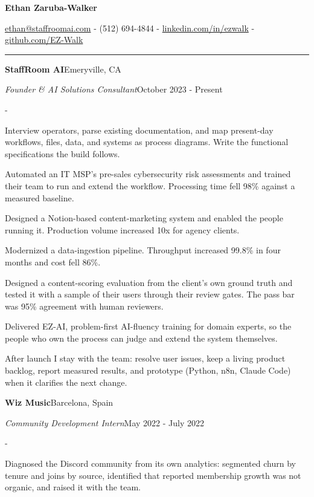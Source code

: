 \documentclass[10pt,letterpaper]{article}
\newenvironment{cvitems}{%
  \begin{list}{-}{%
    \setlength{\leftmargin}{12pt}%
    \setlength{\itemsep}{1.2pt}%
    \setlength{\parsep}{0pt}%
    \setlength{\topsep}{1.5pt}%
    \setlength{\partopsep}{0pt}%
    \setlength{\labelwidth}{6pt}%
    \setlength{\labelsep}{6pt}%
    \setlength{\itemindent}{0pt}%
  }%
}{\end{list}}
\newcommand{\cvsection}[1]{%
  \vspace{7pt}%
  \noindent{\bfseries\fontsize{11pt}{13pt}\selectfont\MakeUppercase{#1}}\par
  \vspace{1pt}%
  \noindent\rule{\textwidth}{0.4pt}\par
  \vspace{4pt}%
}
\newcommand{\cventryhead}[4]{%
  \noindent\textbf{#1}\hfill#2\par
  \vspace{0.5pt}%
  \noindent\textit{#3}\hfill#4\par
}
\begin{document}
\begin{center}
  {\bfseries\fontsize{22pt}{24pt}\selectfont Ethan Zaruba-Walker\par}
  \vspace{4pt}
  {\fontsize{10pt}{12pt}\selectfont
    \href{mailto:ethan@staffroomai.com}{ethan@staffroomai.com}
    {-}
    (512) 694-4844
    {-}
    \href{https://linkedin.com/in/ezwalk}{linkedin.com/in/ezwalk}
    {-}
    \href{https://github.com/EZ-Walk}{github.com/EZ-Walk}\par}
\end{center}
\vspace{2pt}

\cvsection{Experience}

\cventryhead{StaffRoom AI}{Emeryville, CA}
{Founder \& AI Solutions Consultant}{October 2023 - Present}
\begin{cvitems}
  \item Interview operators, parse existing documentation, and map present-day workflows, files, data, and systems as process diagrams. Write the functional specifications the build follows.
  \item Automated an IT MSP's pre-sales cybersecurity risk assessments and trained their team to run and extend the workflow. Processing time fell 98\% against a measured baseline.
  \item Designed a Notion-based content-marketing system and enabled the people running it. Production volume increased 10x for agency clients.
  \item Modernized a data-ingestion pipeline. Throughput increased 99.8\% in four months and cost fell 86\%.
  \item Designed a content-scoring evaluation from the client's own ground truth and tested it with a sample of their users through their review gates. The pass bar was 95\% agreement with human reviewers.
  \item Delivered EZ-AI, problem-first AI-fluency training for domain experts, so the people who own the process can judge and extend the system themselves.
  \item After launch I stay with the team: resolve user issues, keep a living product backlog, report measured results, and prototype (Python, n8n, Claude Code) when it clarifies the next change.
\end{cvitems}

\vspace{3pt}
\cventryhead{Wiz Music}{Barcelona, Spain}
{Community Development Intern}{May 2022 - July 2022}
\begin{cvitems}
  \item Diagnosed the Discord community from its own analytics: segmented churn by tenure and joins by source, identified that reported membership growth was not organic, and raised it with the team.
\end{cvitems}
\end{document}
